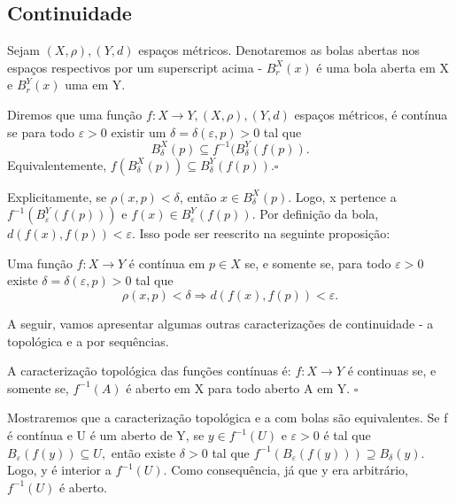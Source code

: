 \documentclass[MetricSpaces/metric_notes.tex]{subfiles}
\begin{document}
\subsection{Continuidade}
Sejam \((X, \rho ), (Y, d)\) espaços métricos. Denotaremos as bolas abertas nos espaços respectivos por um superscript acima - \(B^{X}_{r}(x)\) é uma bola aberta
em X e \(B_{r}^{Y}(x)\) uma em Y.
\begin{def*}
	Diremos que uma função \(f:X\rightarrow Y, (X, \rho ), (Y, d)\) espaços métricos, é contínua se para todo \(\varepsilon >0\) existir um \(\delta = \delta (\varepsilon, p) > 0\) tal que
	\[
		B_{\delta }^{X}(p)\subseteq{f^{-1}(B_{\delta }^{Y}(f(p))}.
	\]
	Equivalentemente, \(f(B_{\delta }^{X}(p))\subseteq{B_{\delta }^{Y}(f(p))}.\square\)
\end{def*}
Explicitamente, se \(\rho (x, p) < \delta \), então \(x\in B_{\delta }^{X}(p).\) Logo, x pertence a \(f^{-1}(B_{\varepsilon }^{Y}(f(p)))\) e
\(f(x)\in B_{\varepsilon }^{Y}(f(p)).\) Por definição da bola, \(d(f(x), f(p)) < \varepsilon.\) Isso pode ser reescrito na seguinte proposição:
\begin{prop*}
	Uma função \(f:X\rightarrow Y\) é contínua em \(p\in X\) se, e somente se, para todo \(\varepsilon >0\) existe
	\(\delta = \delta (\varepsilon , p) > 0\) tal que
	\[
		\rho (x, p)<\delta  \Rightarrow d(f(x), f(p)) <\varepsilon .
	\]
\end{prop*}

A seguir, vamos apresentar algumas outras caracterizações de continuidade - a topológica e a por sequências.
\begin{def*}
	A caracterização topológica das funções contínuas é: \(f:X\rightarrow Y\) é continuas se, e somente se, \(f^{-1}(A)\) é aberto em X para todo aberto A em Y. \(\square\)
\end{def*}
Mostraremos que a caracterização topológica e a com bolas são equivalentes. Se f é contínua e U é um aberto de Y, se
\(y\in f^{-1}(U)\) e \(\varepsilon > 0\) é tal que \(B_{\varepsilon }(f(y)) \subseteq{U},\) então existe \(\delta  > 0\)
tal que \(f^{-1}(B_{\varepsilon }(f(y)))\supseteq{B_{\delta }(y)}.\) Logo, y é interior a \(f^{-1}(U).\) Como
consequência, já que y era arbitrário, \(f^{-1}(U)\) é aberto.
\end{document}
